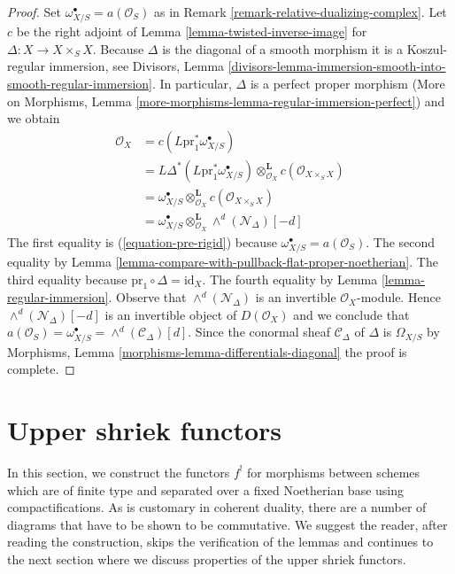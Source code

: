 \begin{proof}
Set $\omega_{X/S}^\bullet = a(\mathcal{O}_S)$ as in
Remark \ref{remark-relative-dualizing-complex}.
Let $c$ be the right adjoint of Lemma \ref{lemma-twisted-inverse-image} for
$\Delta : X \to X \times_S X$. Because $\Delta$
is the diagonal of a smooth morphism it is a
Koszul-regular immersion, see Divisors, Lemma
\ref{divisors-lemma-immersion-smooth-into-smooth-regular-immersion}.
In particular, $\Delta$ is a perfect proper morphism
(More on Morphisms, Lemma \ref{more-morphisms-lemma-regular-immersion-perfect})
and we obtain
\begin{align*}
\mathcal{O}_X
& =
c(L\text{pr}_1^*\omega_{X/S}^\bullet) \\
& =
L\Delta^*(L\text{pr}_1^*\omega_{X/S}^\bullet)
\otimes_{\mathcal{O}_X}^\mathbf{L}
c(\mathcal{O}_{X \times_S X}) \\
& =
\omega_{X/S}^\bullet \otimes_{\mathcal{O}_X}^\mathbf{L}
c(\mathcal{O}_{X \times_S X}) \\
& =
\omega_{X/S}^\bullet
\otimes_{\mathcal{O}_X}^\mathbf{L}
\wedge^d(\mathcal{N}_\Delta)[-d]
\end{align*}
The first equality is (\ref{equation-pre-rigid}) because
$\omega_{X/S}^\bullet = a(\mathcal{O}_S)$. The second equality by
Lemma \ref{lemma-compare-with-pullback-flat-proper-noetherian}.
The third equality because $\text{pr}_1 \circ \Delta = \text{id}_X$.
The fourth equality by Lemma \ref{lemma-regular-immersion}.
Observe that $\wedge^d(\mathcal{N}_\Delta)$ is an invertible
$\mathcal{O}_X$-module. Hence $\wedge^d(\mathcal{N}_\Delta)[-d]$
is an invertible object of $D(\mathcal{O}_X)$ and we conclude that
$a(\mathcal{O}_S) = \omega_{X/S}^\bullet = \wedge^d(\mathcal{C}_\Delta)[d]$.
Since the conormal sheaf $\mathcal{C}_\Delta$ of $\Delta$ is
$\Omega_{X/S}$ by
Morphisms, Lemma \ref{morphisms-lemma-differentials-diagonal}
the proof is complete.
\end{proof}







\section{Upper shriek functors}
\label{section-upper-shriek}

\noindent
In this section, we construct the functors $f^!$ for morphisms
between schemes which are of finite type and separated
over a fixed Noetherian base using compactifications.
As is customary in coherent duality, there are a number of diagrams
that have to be shown to be commutative. We suggest the reader,
after reading the construction, skips the verification of the
lemmas and continues to the next section where we discuss
properties of the upper shriek functors.

